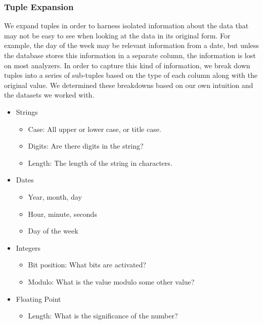 
\subsubsection{Tuple Expansion}
We expand tuples in order to harness isolated information about the data that may not be easy to see when looking at the data in its original form.
For example, the day of the week may be relevant information from a date, but unless the database stores this information in a separate column, the information is lost on most analyzers.
In order to capture this kind of information, we break down tuples into a series of sub-tuples based on the type of each column along with the original value.
We determined these breakdowns based on our own intuition and the datasets we worked with.

\begin{itemize}
\item Strings
\begin{itemize}
\item Case: All upper or lower case, or title case.
\item Digits: Are there digits in the string?
\item Length: The length of the string in characters.
\end{itemize}
\item Dates
\begin{itemize}
\item Year, month, day
\item Hour, minute, seconds
\item Day of the week
\end{itemize}
\item Integers
\begin{itemize}
\item Bit position: What bits are activated?
\item Modulo: What is the value modulo some other value?
\end{itemize}
\item Floating Point
\begin{itemize}
\item Length: What is the significance of the number?
\end{itemize}
\end{itemize}


